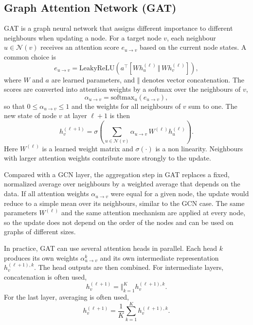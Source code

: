 \subsection{Graph Attention Network (GAT)}
GAT is a graph neural network that assigns different importance to different neighbours when updating a node.
For a target node $v$, each neighbour $u\in\mathcal{N}(v)$ receives an attention score $e_{u\rightarrow v}$ based on the current node states. A common choice is
\begin{equation}
e_{u\rightarrow v}=\mathrm{LeakyReLU}\!\left(a^{\top}\left[W h_{u}^{(\ell)} \,\Vert\, W h_{v}^{(\ell)}\right]\right),
\end{equation}
where $W$ and $a$ are learned parameters, and $\Vert$ denotes vector concatenation.
The scores are converted into attention weights by a softmax over the neighbours of $v$,
\begin{equation}
\alpha_{u\rightarrow v} = \mathrm{softmax}_{u}\!\left(e_{u\rightarrow v}\right),
\end{equation}
so that $0 \leq \alpha_{u\rightarrow v} \leq 1$ and the weights for all neighbours of $v$ sum to one.
The new state of node $v$ at layer $\ell+1$ is then
\begin{equation}
h_{v}^{(\ell+1)} = \sigma\!\left(\sum_{u \in \mathcal{N}(v)} \alpha_{u\rightarrow v}\, W^{(\ell)} h_{u}^{(\ell)}\right).
\end{equation}
Here $W^{(\ell)}$ is a learned weight matrix and $\sigma(\cdot)$ is a non linearity.
Neighbours with larger attention weights contribute more strongly to the update.

\noindent Compared with a GCN layer, the aggregation step in GAT replaces a fixed, normalized average over neighbours by a weighted average that depends on the data.
If all attention weights $\alpha_{u\rightarrow v}$ were equal for a given node, the update would reduce to a simple mean over its neighbours, similar to the GCN case.
The same parameters $W^{(\ell)}$ and the same attention mechanism are applied at every node, so the update does not depend on the order of the nodes and can be used on graphs of different sizes.

\noindent In practice, GAT can use several attention heads in parallel. Each head $k$ produces its own weights $\alpha_{u\rightarrow v}^{k}$ and its own intermediate representation $h_{v}^{(\ell+1),k}$. The head outputs are then combined. For intermediate layers, concatenation is often used,
\begin{equation}
h_{v}^{(\ell+1)}=\big\Vert_{k=1}^{K} h_{v}^{(\ell+1),k}.
\end{equation}
For the last layer, averaging is often used,
\begin{equation}
h_{v}^{(\ell+1)}=\frac{1}{K}\sum_{k=1}^{K} h_{v}^{(\ell+1),k}.
\end{equation}

